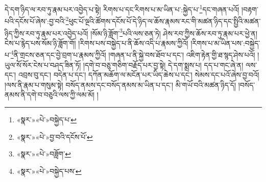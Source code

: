 དེ་དག་ཉིད་ལ་རབ་ཏུ་རྣམ་པར་འབྱེད་པ་སྟེ། རིགས་པ་དང་རིགས་པ་མ་ཡིན་པ་:སྐྱེད་པ་\footnote{«སྣར་»«པེ་»བསྐྱེད་པ་}དང་གཞན་པའོ། །བརྟག་པའི་དངོས་པོ་ཞེས་:བྱ་བའི་\footnote{«སྣར་»«པེ་»བྱ་བའི་དངོས་པོ་}ཕུང་པོ་ལྔའི་ཚོགས་དངོས་པོ་དེ་ཉིད་ལ་ཆོས་རྣམས་རང་གི་མཚན་ཉིད་དང་སྤྱིའི་མཚན་ཉིད་ཀྱིས་རབ་ཏུ་རྣམ་པར་འབྱེད་པའོ། །སོམ་ཉི་ཟློག་\footnote{«སྣར་»«པེ་»བཟློག་}པའི་ལས་ཅན་ཏེ། ཤེས་རབ་ཀྱིས་ཆོས་རབ་ཏུ་རྣམ་པར་ཕྱེ་ན། ངེས་པ་རྙེད་པས་སོམ་ཉི་ཟློག་གོ། །རིགས་པས་བསྐྱེད་པ་ནི་ཆོས་འདི་པ་རྣམས་ཀྱིའོ། །རིགས་པ་མ་ཡིན་པས་:བསྐྱེད་པ་\footnote{«སྣར་»«པེ་»བསྐྱེད་པས་}ནི་གྲངས་ཅན་དང་བྱེ་བྲག་པ་རྣམས་ཀྱིའོ། །གཞན་པ་ནི་སྐྱེ་བས་ཐོབ་པ་དང་། འཇིག་རྟེན་གྱི་ཐ་སྙད་ཤེས་པའོ། །ཡུལ་སོ་སོར་ངེས་པ་བཤད་ཟིན་ཏོ། །དགེ་བ་བཅུ་གཅིག་བརྗོད་པར་བྱ་སྟེ། དེ་དག་སྨྲས་པ། དད་པ་གང་ཞེ་ན། ལས་དང་། འབྲས་བུ་དང་། བདེན་པ་དང་། དཀོན་མཆོག་ལ་མངོན་པར་ཡིད་ཆེས་པ་དང་། སེམས་དང་པའོ་ཞེས་བྱ་བའོ། །ལས་ནི་རྣམ་པ་གསུམ་སྟེ། བསོད་ནམས་དང་བསོད་ནམས་མ་ཡིན་པ་དང་། མི་གཡོ་བའི་མཚན་ཉིད་དོ། །བསོད་ནམས་ནི་དགེ་བ་བཅུའི་ལས་ཀྱི་ལམ་མོ། །
